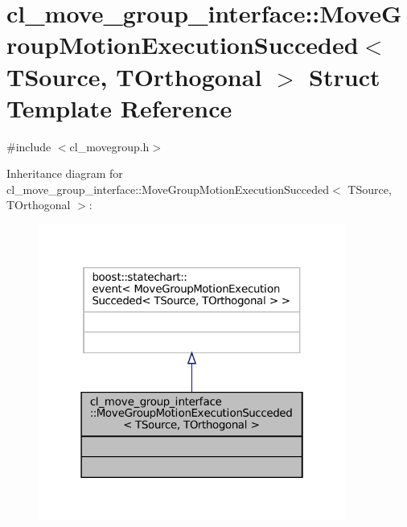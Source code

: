 \hypertarget{structcl__move__group__interface_1_1MoveGroupMotionExecutionSucceded}{}\section{cl\+\_\+move\+\_\+group\+\_\+interface\+:\+:Move\+Group\+Motion\+Execution\+Succeded$<$ T\+Source, T\+Orthogonal $>$ Struct Template Reference}
\label{structcl__move__group__interface_1_1MoveGroupMotionExecutionSucceded}


{\ttfamily \#include $<$cl\+\_\+movegroup.\+h$>$}



Inheritance diagram for cl\+\_\+move\+\_\+group\+\_\+interface\+:\+:Move\+Group\+Motion\+Execution\+Succeded$<$ T\+Source, T\+Orthogonal $>$\+:
\nopagebreak
\begin{figure}[H]
\begin{center}
\leavevmode
\includegraphics[width=286pt]{structcl__move__group__interface_1_1MoveGroupMotionExecutionSucceded__inherit__graph}
\end{center}
\end{figure}


